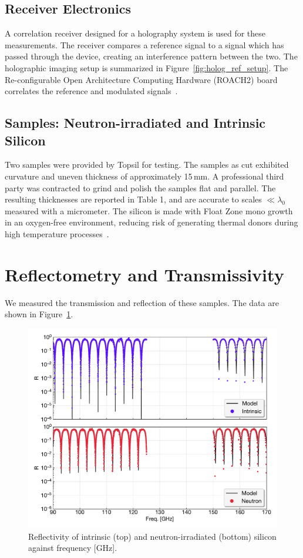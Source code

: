 \subsection{Receiver Electronics}
A correlation receiver designed for a holography system is used for these measurements. The receiver compares a reference signal to a signal which has passed through the device, creating an interference pattern between the two.   The holographic imaging setup is summarized in Figure~\ref{fig:holog_ref_setup}.   The Re-configurable Open Architecture Computing Hardware (ROACH2) board correlates the reference and modulated signals~\cite{roach2}.

\subsection{Samples: Neutron-irradiated and Intrinsic Silicon}
Two samples were provided by Topsil for testing. The samples as cut exhibited curvature and uneven thickness of approximately 15\,mm. A professional third party was contracted to grind and polish the samples flat and parallel. The
resulting thicknesses are reported in Table 1, and are accurate to scales $\ll \lambda_0$ measured with a micrometer. The silicon is made with Float Zone mono growth in an oxygen-free environment, reducing risk of generating thermal donors during
high temperature processes~\cite{topsil}.
\section{Reflectometry and Transmissivity}
We measured the transmission and reflection of these samples. The data are shown in Figure~\ref{fig:si_data}.
\begin{figure}[t]
    \centering
    \includegraphics[width = \textwidth]{Figures/silicon_refl.pdf}
    \caption{Reflectivity of intrinsic (top) and neutron-irradiated (bottom) silicon against frequency [GHz].}
    \label{fig:si_data}
\end{figure}

